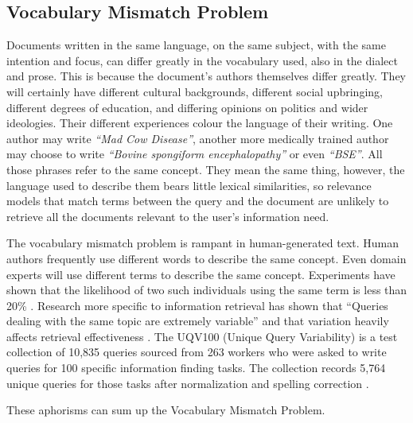 \subsection{Vocabulary Mismatch Problem}
Documents written in the same language, on the same subject, with the same intention and focus, can differ greatly in the vocabulary used, also in the dialect and prose. This is because the document's authors themselves differ greatly. They will certainly have different cultural backgrounds, different social upbringing, different degrees of education, and differing opinions on politics and wider ideologies. Their different experiences colour the language of their writing. One author may write \textit{``Mad Cow Disease''}, another more medically trained author may choose to write \textit{``Bovine spongiform encephalopathy''} or even \textit{``BSE''}. All those phrases refer to the same concept. They mean the same thing, however, the language used to describe them bears little lexical similarities, so relevance models that match terms between the query and the document are unlikely to retrieve all the documents relevant to the user's information need.

The vocabulary mismatch problem is rampant in human-generated text. Human authors frequently use different words to describe the same concept. Even domain experts will use different terms to describe the same concept. Experiments have shown that the likelihood of two such individuals using the same term is less than 20\% \cite{Furnas:1987:VPH:32206.32212}. Research more specific to information retrieval has shown that ``Queries dealing with the same topic are extremely variable'' \cite{buckley1999trec} and that variation heavily affects retrieval effectiveness \cite{bailey2015user}. The UQV100 (Unique Query Variability) is a test collection of 10,835 queries sourced from 263 workers who were asked to write queries for 100 specific information finding tasks. The collection records 5,764 unique queries for those tasks after normalization and spelling correction \cite{bailey2016uqv100}.



These aphorisms can sum up the Vocabulary Mismatch Problem.

